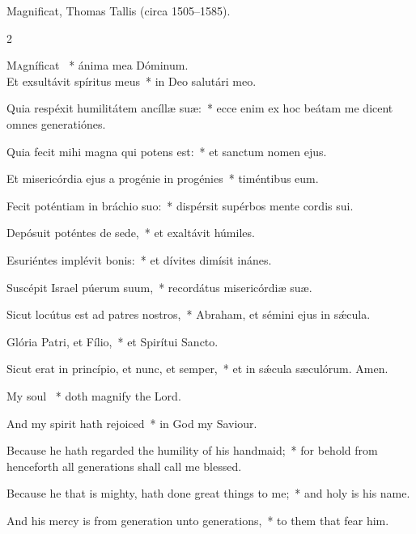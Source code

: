 \documentclass[12pt]{book}
\begin{document}
\smallskip

\begin{flushright}
Magnificat, Thomas Tallis (circa 1505–1585).\end{flushright}



\begin{paracol}{2}

\lettrine{M}agníficat \cc~* ánima mea Dóminum.\\ Et exsultávit spíritus meus~* in Deo salutári meo.

 Quia respéxit humilitátem ancíllæ suæ:~* ecce enim ex hoc beátam me dicent o\-mnes generatiónes.

 Quia fecit mihi magna qui potens est:~* et san\-ctum nomen ejus.

 Et misericórdia ejus a progénie in progénies~* timéntibus eum.

 Fecit poténtiam in bráchio suo:~* dispérsit supérbos mente cordis sui.

 Depósuit poténtes de sede,~* et exaltávit húmiles.

 Esuriéntes implévit bonis:~* et dívites dimísit inánes.

 Suscépit Israel púerum suum,~* recordátus misericórdiæ suæ.

 Sicut locútus est ad patres no\-stros,~* Abraham, et sémini ejus in sǽcula.

 Glória Patri, et Fílio,~* et Spirítui San\-cto.

 Sicut erat in princípio, et nunc, et semper,~* et in sǽcula sæculórum. Amen.
 
 \switchcolumn
 \begin{enpars}
My soul \cc~* doth magnify the Lord.

And my spirit hath rejoiced~* in God my Saviour.

Because he hath regarded the humility of his handmaid;~* for behold from henceforth all generations shall call me blessed.

Because he that is mighty, hath done great things to me;~* and holy is his name.

And his mercy is from generation unto generations,~* to them that fear him.


\end{enpars}
\end{paracol}
\end{document}
